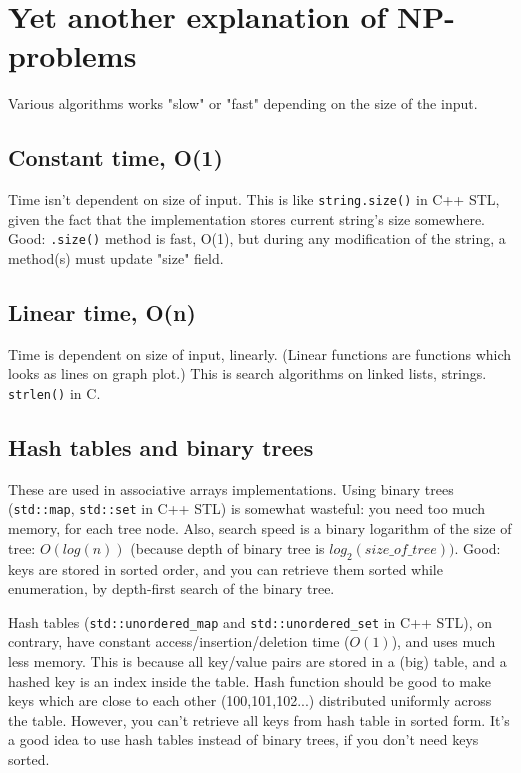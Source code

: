 \section{Yet another explanation of NP-problems}

Various algorithms works "slow" or "fast" depending on the size of the input.

\subsection{Constant time, O(1)}

Time isn't dependent on size of input.
This is like \verb|string.size()| in C++ STL, given the fact that the implementation stores current string's size somewhere.
Good: \verb|.size()| method is fast, O(1), but during any modification of the string, a method(s) must update "size" field.

\subsection{Linear time, O(n)}

Time is dependent on size of input, linearly.
(Linear functions are functions which looks as lines on graph plot.)
This is search algorithms on linked lists, strings.
\verb|strlen()| in C.

\subsection{Hash tables and binary trees}

These are used in associative arrays implementations.
Using binary trees (\verb|std::map|, \verb|std::set| in C++ STL) is somewhat wasteful: you need too much memory, for each tree node.
Also, search speed is a binary logarithm of the size of tree: $O(log(n))$ (because depth of binary tree is $log_2(size\_of\_tree))$.
Good: keys are stored in sorted order, and you can retrieve them sorted while enumeration, by depth-first search of the binary tree.

Hash tables (\verb|std::unordered_map| and \verb|std::unordered_set| in C++ STL), on contrary, have constant access/insertion/deletion time
($O(1)$), and uses much less memory.
This is because all key/value pairs are stored in a (big) table, and a hashed key is an index inside the table.
Hash function should be good to make keys which are close to each other (100,101,102...) distributed uniformly across the table.
However, you can't retrieve all keys from hash table in sorted form.
It's a good idea to use hash tables instead of binary trees, if you don't need keys sorted.

